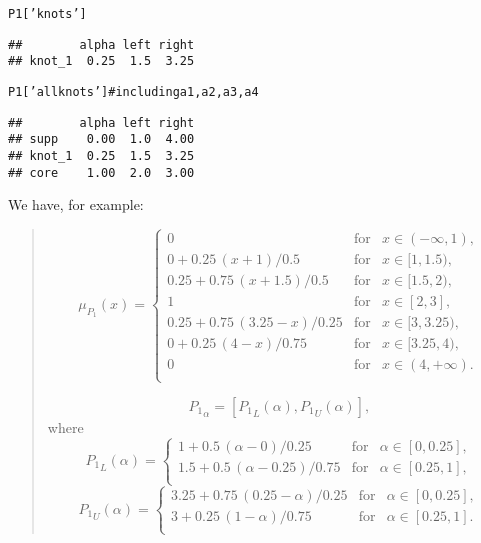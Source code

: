 \documentclass[11pt]{article}\usepackage{graphicx, color}
\makeatletter
\newcommand{\hlstring}[1]{\textcolor[rgb]{0.6,0.6,1}{#1}}%
\newcommand{\hlcomment}[1]{\textcolor[rgb]{0.180392156862745,0.6,0.341176470588235}{#1}}%
\newenvironment{kframe}{%
 \def\at@end@of@kframe{}%
 \ifinner\ifhmode%
  \def\at@end@of@kframe{\end{minipage}}%
  \begin{minipage}{\columnwidth}%
 \fi\fi%
 \def\FrameCommand##1{\hskip\@totalleftmargin \hskip-\fboxsep
 \colorbox{shadecolor}{##1}\hskip-\fboxsep
     \hskip-\linewidth \hskip-\@totalleftmargin \hskip\columnwidth}%
 \MakeFramed {\advance\hsize-\width
   \@totalleftmargin\z@ \linewidth\hsize
   \@setminipage}}%
 {\par\unskip\endMakeFramed%
 \at@end@of@kframe}
\newenvironment{knitrout}{}{} %
\makeatother
\begin{document}
\begin{knitrout}\small
{}\color{fgcolor}\begin{kframe}
\begin{alltt}
P1[\hlstring{'knots'}]
\end{alltt}
\begin{verbatim}
##        alpha left right
## knot_1  0.25  1.5  3.25
\end{verbatim}
\begin{alltt}
P1[\hlstring{'allknots'}] \hlcomment{# including a1,a2,a3,a4}
\end{alltt}
\begin{verbatim}
##        alpha left right
## supp    0.00  1.0  4.00
## knot_1  0.25  1.5  3.25
## core    1.00  2.0  3.00
\end{verbatim}
\end{kframe}
\end{knitrout}


We have, for example:
\begin{quote}
\[
\mu_{P_1}(x) = \left\{
\begin{array}{lll}
0      & \text{for} & x\in(-\infty,1), \\
0+0.25\,(x+1)/0.5 & \text{for} & x\in[1,1.5), \\
0.25+0.75\,(x+1.5)/0.5 & \text{for} & x\in[1.5,2), \\
1      & \text{for} & x\in[2,3], \\
0.25+0.75\,(3.25-x)/0.25 & \text{for} & x\in[3,3.25), \\
0+0.25\,(4-x)/0.75 & \text{for} & x\in[3.25,4), \\
0      & \text{for} & x\in(4,+\infty). \\
\end{array}
\right.
\]

\[
{P_1}_\alpha = [{P_1}_L(\alpha), {P_1}_U(\alpha)],
\]
where
\[
{P_1}_L(\alpha) = \left\{
\begin{array}{lll}
1+0.5\,(\alpha-0)/0.25 & \text{for} & \alpha\in[0,0.25], \\
1.5+0.5\,(\alpha-0.25)/0.75 & \text{for} & \alpha\in[0.25,1], \\
\end{array}
\right.
\]
\[
{P_1}_U(\alpha) = \left\{
\begin{array}{lll}
3.25+0.75\,(0.25-\alpha)/0.25 & \text{for} & \alpha\in[0,0.25], \\
3+0.25\,(1-\alpha)/0.75 & \text{for} & \alpha\in[0.25,1]. \\
\end{array}
\right.
\]

\end{quote}
\end{document}
